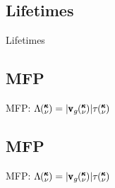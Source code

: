 \documentclass{beamer}
\newcommand{\kv}{\mspace{-4.0mu}\left(\mspace{-8.0mu}
\begin{smallmatrix}&\pmb{\kappa} \\&\nu\end{smallmatrix}
\mspace{-3.0mu}\right)}
\begin{document}
\subsection{Lifetimes}
\begin{frame}{Lifetimes}
\begin{figure}[!h]
\begin{center}
\vspace*{-0.8cm}
\hspace*{-1cm}
\renewcommand{\figure}{Fig.}
\label{fig:lifetimes}
\end{center}
\end{figure}
\end{frame}

\subsection{MFP}
\begin{frame}{MFP: $\Lambda \kv=|{\pmb{\mathrm{v}}_{g}\kv}|{\tau\kv}$}
\begin{figure}[t]
\begin{center}
\vspace*{-0.6cm}
\renewcommand{\figure}{Fig.}
\label{fig:mfp_contribution}
\end{center}
\end{figure}
\end{frame}

\subsection{MFP}
\begin{frame}{MFP: $\Lambda \kv=|{\pmb{\mathrm{v}}_{g}\kv}|{\tau\kv}$}
\begin{figure}[t]
\begin{center}
\vspace*{-0.6cm}
\renewcommand{\figure}{Fig.}
\label{fig:mfp_contribution}
\end{center}
\end{figure}
\end{frame}
\end{document}

